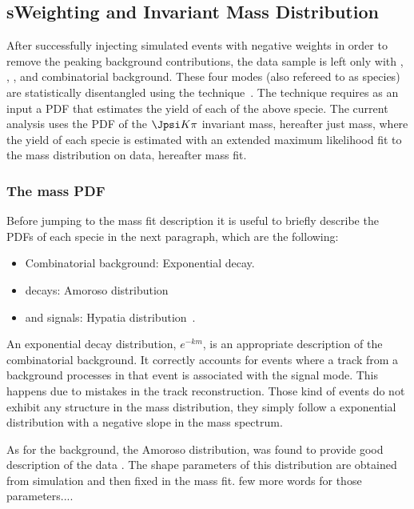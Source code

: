 \subsection{sWeighting and Invariant Mass Distribution}
\label{sWeighting_and_mass}

After successfully injecting simulated events with negative weights in order to remove the peaking background contributions, the data sample is left only with
\BdJpsiKpi, \BsJpsiKpi, \LbJpsippi, and combinatorial background. These four modes (also refereed to as species) are statistically 
disentangled using the \sPlot technique~\cite{splot}. The technique requires as an input a PDF that estimates the yield of each 
of the above specie. The current analysis uses the PDF of the $\Jpsi K\pi$ invariant mass, hereafter just mass, where the yield of each specie
is estimated with an extended maximum likelihood fit to the mass distribution on data, hereafter mass fit. 

\subsubsection{The mass PDF}
Before jumping to the mass fit description it is useful to briefly describe the PDFs of each specie in the next paragraph, which are the following:  

\begin{itemize}
\item Combinatorial background: Exponential decay.
\item \LbJpsippi decays: Amoroso distribution~\cite{Amoroso}
\item \Bd and \Bs signals: Hypatia distribution~\cite{Santos:2013gra}.
\end{itemize}

\noindent An exponential decay distribution, $e^{-km}$, is an appropriate description of the combinatorial background. It correctly accounts for events where
a track from a background processes in that event is associated with the signal mode. This happens due to mistakes in the track reconstruction.
Those kind of events do not exhibit any structure in the mass distribution, they simply follow a exponential distribution with a negative slope in the mass spectrum. 

As for the \LbJpsippi background, the Amoroso distribution, was found to provide good description of the data . 
The shape parameters of this distribution are obtained from simulation and then fixed in the mass fit. {\color{red} few more words for those parameters....}

